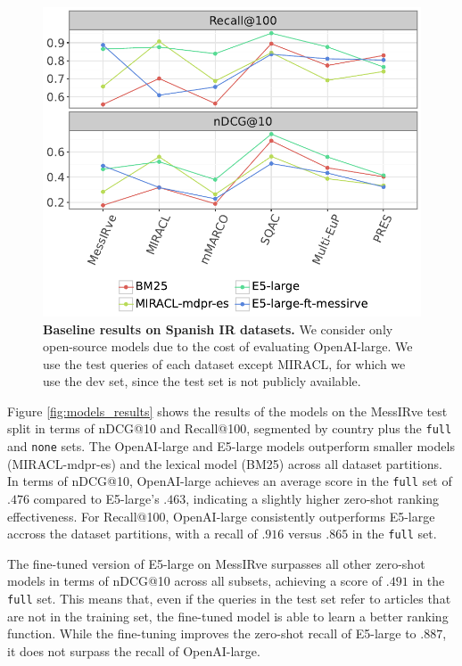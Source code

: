 \documentclass[11pt]{article}
\begin{document}
\begin{figure}[ht]
  \centering
  \includegraphics[width=\columnwidth]{plots/other_datasets_results.pdf}
  \caption{\textbf{Baseline results on Spanish IR datasets.} We consider only open-source models due to the cost of evaluating OpenAI-large. We use the test queries of each dataset except MIRACL, for which we use the dev set, since the test set is not publicly available.
  }
  \label{fig:other_datasets_results}
\end{figure}


Figure \ref{fig:models_results} shows the results of the models on the MessIRve test split in terms of nDCG@10 and Recall@100, segmented by country plus the \texttt{full} and \texttt{none} sets. The OpenAI-large and E5-large models outperform smaller models (MIRACL-mdpr-es) and the lexical model (BM25) across all dataset partitions. In terms of nDCG@10, OpenAI-large achieves an average score in the \texttt{full} set of $.476$ compared to E5-large's $.463$, indicating a slightly higher zero-shot ranking effectiveness. For Recall@100, OpenAI-large consistently outperforms E5-large accross the dataset partitions, with a recall of $.916$ versus $.865$ in the \texttt{full} set.

The fine-tuned version of E5-large on MessIRve surpasses all other zero-shot models in terms of nDCG@10 across all subsets, achieving a score of $.491$ in the \texttt{full} set. This means that, even if the queries in the test set refer to articles that are not in the training set, the fine-tuned model is able to learn a better ranking function. While the fine-tuning improves the zero-shot recall of E5-large to $.887$, it does not surpass the recall of OpenAI-large.
\end{document}
